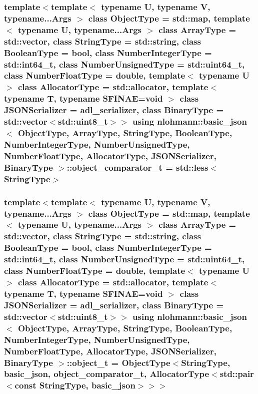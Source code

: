 \subsubsection[{\texorpdfstring{object\+\_\+comparator\+\_\+t}{object_comparator_t}}]{\setlength{\rightskip}{0pt plus 5cm}template$<$template$<$ typename U, typename V, typename...\+Args $>$ class Object\+Type = std\+::map, template$<$ typename U, typename...\+Args $>$ class Array\+Type = std\+::vector, class String\+Type  = std\+::string, class Boolean\+Type  = bool, class Number\+Integer\+Type  = std\+::int64\+\_\+t, class Number\+Unsigned\+Type  = std\+::uint64\+\_\+t, class Number\+Float\+Type  = double, template$<$ typename U $>$ class Allocator\+Type = std\+::allocator, template$<$ typename T, typename S\+F\+I\+N\+A\+E=void $>$ class J\+S\+O\+N\+Serializer = adl\+\_\+serializer, class Binary\+Type  = std\+::vector$<$std\+::uint8\+\_\+t$>$$>$ using {\bf nlohmann\+::basic\+\_\+json}$<$ Object\+Type, Array\+Type, String\+Type, Boolean\+Type, Number\+Integer\+Type, Number\+Unsigned\+Type, Number\+Float\+Type, Allocator\+Type, J\+S\+O\+N\+Serializer, Binary\+Type $>$\+::{\bf object\+\_\+comparator\+\_\+t} =  std\+::less$<$String\+Type$>$}\hypertarget{classnlohmann_1_1basic__json_ac26c2e8d6bcaccde372ceedd81851200}{}\label{classnlohmann_1_1basic__json_ac26c2e8d6bcaccde372ceedd81851200}
\subsubsection[{\texorpdfstring{object\+\_\+t}{object_t}}]{\setlength{\rightskip}{0pt plus 5cm}template$<$template$<$ typename U, typename V, typename...\+Args $>$ class Object\+Type = std\+::map, template$<$ typename U, typename...\+Args $>$ class Array\+Type = std\+::vector, class String\+Type  = std\+::string, class Boolean\+Type  = bool, class Number\+Integer\+Type  = std\+::int64\+\_\+t, class Number\+Unsigned\+Type  = std\+::uint64\+\_\+t, class Number\+Float\+Type  = double, template$<$ typename U $>$ class Allocator\+Type = std\+::allocator, template$<$ typename T, typename S\+F\+I\+N\+A\+E=void $>$ class J\+S\+O\+N\+Serializer = adl\+\_\+serializer, class Binary\+Type  = std\+::vector$<$std\+::uint8\+\_\+t$>$$>$ using {\bf nlohmann\+::basic\+\_\+json}$<$ Object\+Type, Array\+Type, String\+Type, Boolean\+Type, Number\+Integer\+Type, Number\+Unsigned\+Type, Number\+Float\+Type, Allocator\+Type, J\+S\+O\+N\+Serializer, Binary\+Type $>$\+::{\bf object\+\_\+t} =  Object\+Type$<$String\+Type, {\bf basic\+\_\+json}, {\bf object\+\_\+comparator\+\_\+t}, Allocator\+Type$<$std\+::pair$<$const String\+Type, {\bf basic\+\_\+json}$>$$>$$>$}\hypertarget{classnlohmann_1_1basic__json_a5e3df077f880583a96d74cd63e173cb2}{}\label{classnlohmann_1_1basic__json_a5e3df077f880583a96d74cd63e173cb2}


